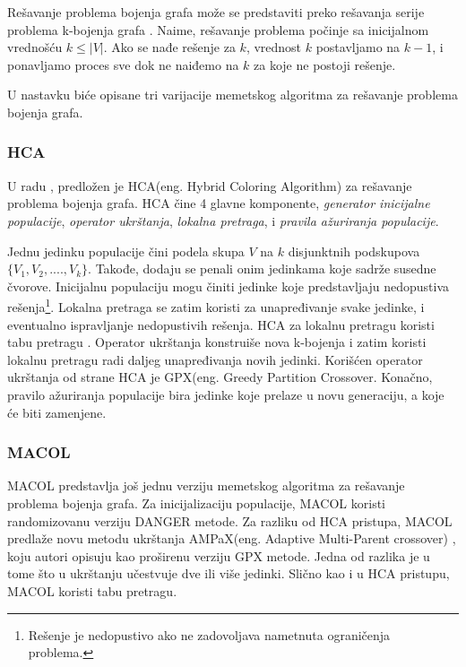 \documentclass[a4paper]{article}
\begin{document}
Rešavanje problema bojenja grafa može se predstaviti preko rešavanja serije problema k-bojenja grafa \cite{galinier1999hybrid}. 
Naime, rešavanje problema počinje sa inicijalnom vrednošću $k \leq |V|$. 
Ako se nađe rešenje za $k$, vrednost $k$ postavljamo na $k-1$, i ponavljamo proces sve dok ne naiđemo na $k$ za koje ne postoji rešenje.

U nastavku biće opisane tri varijacije memetskog algoritma za rešavanje problema bojenja grafa. 

\subsubsection{HCA}
U radu \cite{galinier1999hybrid}, predložen je HCA(eng. Hybrid Coloring Algorithm) za rešavanje problema bojenja grafa.
HCA čine 4 glavne komponente, \textit{generator inicijalne populacije}, \textit{operator ukrštanja}, \textit{lokalna pretraga}, i \textit{pravila ažuriranja populacije}.

Jednu jedinku populacije čini podela skupa $V$ na $k$  disjunktnih podskupova $\{V_1, V_2, ...., V_k\}$. Takođe, dodaju se penali onim jedinkama koje sadrže susedne čvorove. Inicijalnu populaciju mogu činiti jedinke koje predstavljaju nedopustiva rešenja\footnote{Rešenje je nedopustivo ako ne zadovoljava nametnuta ograničenja problema.}. 
Lokalna pretraga se zatim koristi za unapređivanje svake jedinke, i eventualno ispravljanje nedopustivih rešenja.
HCA za lokalnu pretragu koristi tabu pretragu \cite{tabu_pretraga_miskovic}.
Operator ukrštanja konstruiše nova k-bojenja i zatim koristi lokalnu pretragu radi daljeg unapređivanja novih jedinki. 
Korišćen operator ukrštanja od strane HCA je GPX(eng. Greedy Partition Crossover\cite{galinier1999hybrid}.
Konačno, pravilo ažuriranja populacije bira jedinke koje prelaze u novu generaciju, a koje će biti zamenjene.
\subsubsection{MACOL}
MACOL \cite{lu2010memetic} predstavlja još jednu verziju memetskog algoritma za rešavanje problema bojenja grafa. Za inicijalizaciju populacije, MACOL koristi randomizovanu verziju DANGER \cite{glover1996coloring} metode. 
Za razliku od HCA pristupa, MACOL predlaže novu metodu ukrštanja AMPaX(eng. Adaptive Multi-Parent crossover) \cite{lu2010memetic}, koju autori opisuju kao proširenu verziju GPX metode. Jedna od razlika je u tome što u ukrštanju učestvuje dve ili više jedinki. Slično kao i u HCA pristupu, MACOL koristi tabu pretragu.
\end{document}
